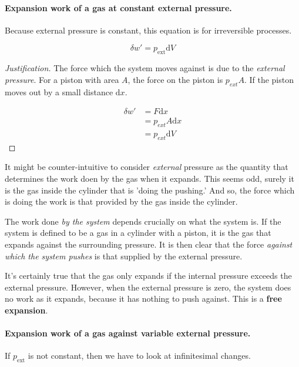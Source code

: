 \documentclass{article}
\numberwithin{theorem}{section}
\numberwithin{corollary}{section}
\numberwithin{postulate}{section}
\numberwithin{lemma}{section}
\numberwithin{definition}{section}
\newenvironment{justification} {\begin{proof}[Justification]} {\end{proof}}
\begin{document}
\paragraph{Expansion work of a gas at constant external pressure.} Because
external pressure is constant, this equation is for irreversible processes.

\begin{equation}
  \delta w' = p_{\mathrm{ext}} \mathrm{d}V
\end{equation}

\begin{justification}
  The force which the system moves against is due to the \textit{external
  pressure}. For a piston with area $A$, the force on the piston is $p_{ext}A$. If the
  piston moves out by a small distance $\mathrm{d}x$.

  \begin{equation*}
  \begin{split}
    \delta w' & = F\mathrm{d}x \\
    & =  p_{ext} A \mathrm{d}x \\
    & = p_{ext} \mathrm{d}V
  \end{split}
\end{equation*}

\end{justification}

It might be counter-intuitive to consider \textit{external} pressure as the
quantity that determines the work doen by the gas when it expands. This seems
odd, surely it is the gas inside the cylinder that is 'doing the pushing.' And
so, the force which is doing the work is that provided by the gas inside the
cylinder.

The work done \textit{by the system} depends crucially on what the system is. If
the system is defined to be a gas in a cylinder with a piston, it is the gas
that expands against the surrounding pressure. It is then clear that the force \textit{against which the system pushes} is that
supplied by the external pressure.

It's certainly true that the gas only expands if the internal pressure exceeds
the external pressure. However, when the external pressure is zero, the system does no work as it expands,
because it has nothing to push against. This is a \textbf{free expansion}.

\paragraph{Expansion work of a gas against variable external pressure. }If
$p_\mathrm{ext}$ is not constant, then we have to look at infinitesimal
changes.
\end{document}
